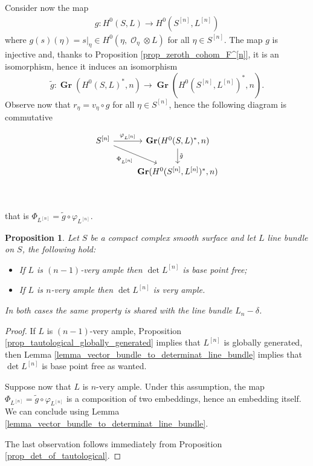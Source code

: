 \documentclass{article}
\DeclareMathOperator{\cO}{\mathcal{O}}
\DeclareMathOperator{\gr}{\mathbf{Gr}}
\newcommand{\hilb}[2][n]{#2^{[#1]}}
\newtheorem{proposition}{Proposition}[section]
\begin{document}
Consider now the map 
\begin{align*}
    g:H^0(S,L)\to H^0(\hilb{S},\hilb{L})
\end{align*} 
where $g(s)(\eta)=s|_\eta\in H^0(\eta,\cO_\eta\otimes L)$ for all $\eta\in \hilb{S}$. The map $g$ is injective and, thanks to Proposition \ref{prop_zeroth_cohom_F^[n]}, it is an isomorphism, hence it induces an isomorphism $$\tilde{g} :\gr(H^0(S,L)^*,n)\to \gr(H^0(\hilb{S},\hilb{L})^*,n).$$ Observe now that $r_\eta=v_\eta\circ g$ for all $\eta\in\hilb{S}$, hence the following diagram is commutative 

\[\begin{tikzcd}
	{\hilb{S}} & {\gr(H^0(S,L)^*,n)} \\
	& {\gr(H^0(\hilb{S},\hilb{L})^*,n)} \\
	& {}
	\arrow["{\varphi_{\hilb{L}}}", from=1-1, to=1-2]
	\arrow["{\Phi_{\hilb{L}}}"', from=1-1, to=2-2]
	\arrow["{\tilde{g}}", from=1-2, to=2-2]
\end{tikzcd}\]

that is $\Phi_{\hilb{L}}=\tilde{g}\circ\varphi_{\hilb{L}}$.


\begin{proposition}\label{prop_det_of_tautological_bpf_va}
    Let $S$ be a compact complex smooth surface and let $L$ line bundle on $S$, the following hold:
    \begin{itemize}
        \item If $L$ is $(n-1)$-very ample then $\det \hilb{L}$ is base point free;
        \item If $L$ is $n$-very ample then $\det \hilb{L}$ is very ample.
    \end{itemize}
    In both cases the same property is shared with the line bundle $L_n-\delta$.
\end{proposition}

\begin{proof}
If $L$ is $(n-1)$-very ample, Proposition \ref{prop_tautological_globally_generated} implies that $\hilb{L}$ is globally generated, then Lemma \ref{lemma_vector_bundle_to_determinat_line_bundle} implies that $\det \hilb{L}$ is base point free as wanted.

Suppose now that $L$ is $n$-very ample. Under this assumption, the map $\Phi_{\hilb{L}}=\tilde{g}\circ\varphi_{\hilb{L}}$ is a composition of two embeddings, hence an embedding itself. We can conclude using Lemma \ref{lemma_vector_bundle_to_determinat_line_bundle}.

The last observation follows immediately from Proposition \ref{prop_det_of_tautological}.
\end{proof}
\end{document}
